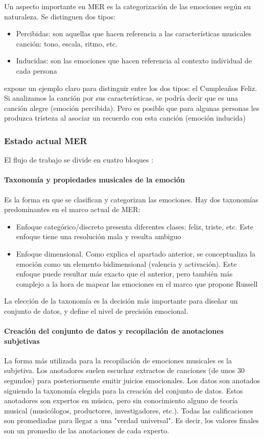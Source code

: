 \documentclass[12pt,a4paper,Spanish]{article}
\begin{document}
Un aspecto importante en MER es la categorización de las emociones según su naturaleza. Se distinguen dos tipos:
\begin{itemize}
\item Percibidas: son aquellas que hacen referencia a las características musicales canción: tono, escala, ritmo, etc.
\item Inducidas: son las emociones que hacen referencia al contexto individual de cada persona
\end{itemize}
\cite{yang2011music} expone un ejemplo claro para distinguir entre los dos tipos: el Cumpleaños Feliz. Si analizamos la canción por sus características, se podría decir que es una canción alegre (emoción percibida). Pero es posible que para algunas personas les produzca tristeza al asociar un recuerdo con esta canción (emoción inducida)

\subsubsection{Estado actual MER}
El flujo de trabajo se divide en cuatro bloques \cite{GomezCanon2021SPM}:


\paragraph{Taxonomía y propiedades musicales de la emoción}\label{tax_emo}
Es la forma en que se clasifican y categorizan las emociones. Hay dos taxonomías predominantes en el marco actual de MER:
\begin{itemize}
	\item Enfoque categórico/discreto presenta diferentes clases: feliz, triste, etc. Este enfoque tiene una resolución mala y resulta ambiguo
	\item Enfoque dimensional. Como explica el apartado anterior, se conceptualiza la emoción como un elemento bidimensional (valencia y activación). Este enfoque puede resultar más exacto que el anterior, pero también más complejo a la hora de mapear las emociones en el marco que propone Russell \cite{posner2005circumplex}
\end{itemize}
La elección de la taxonomía es la decisión más importante para diseñar un conjunto de datos, y define el nivel de precisión emocional.

\paragraph{Creación del conjunto de datos y recopilación de anotaciones subjetivas}
La forma más utilizada para la recopilación de emociones musicales es la subjetiva. Los anotadores suelen escuchar extractos de canciones (de unos 30 segundos) para posteriormente emitir juicios emocionales. Los datos son anotados siguiendo la taxonomía elegida para la creación del conjunto de datos. Estos anotadores son expertos en música, pero sin conocimiento alguno de teoría musical (musicólogos, productores, investigadores, etc.).
\newline
Todas las calificaciones son promediadas para llegar a una "verdad universal". Es decir, los valores finales son un promedio de las anotaciones de cada experto.
\end{document}
